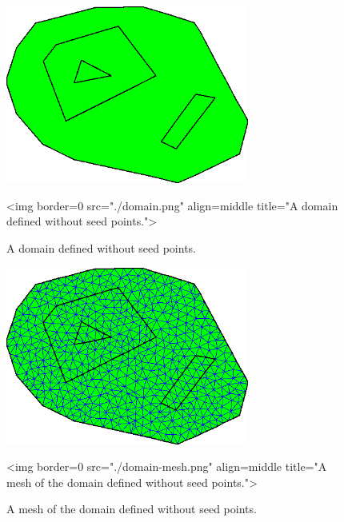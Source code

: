 \begin{figure}[htbp]
\begin{center}
\begin{ccTexOnly}
\includegraphics[width=8cm]{Mesh_2/domain}
\end{ccTexOnly}
\begin{ccHtmlOnly}
<img border=0 src="./domain.png"
     align=middle title="A domain defined without seed points.">
\end{ccHtmlOnly}
\end{center}
\caption{A domain defined without seed points.}
\label{Domain}
\end{figure}

\begin{figure}[htbp]
\begin{center}
\begin{ccTexOnly}
\includegraphics[width=8cm]{Mesh_2/domain-mesh}
\end{ccTexOnly}
\begin{ccHtmlOnly}
<img border=0 src="./domain-mesh.png"
     align=middle title="A mesh of the domain defined without seed points.">
\end{ccHtmlOnly}
\end{center}
\caption{A mesh of the domain defined without seed points.}
\label{Domain-mesh}
\end{figure}

